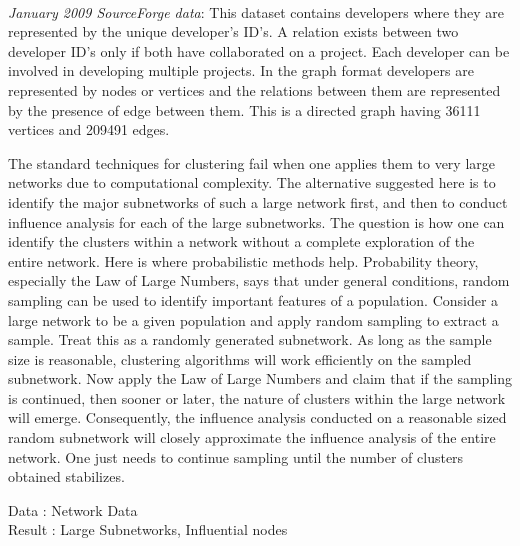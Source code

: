 \\
{\em January 2009 SourceForge data}: This dataset contains developers where they are represented by the unique developer's ID's.
A relation exists between two developer ID's only if both have collaborated on a project. Each developer can be involved
in developing multiple projects. In the graph format developers are represented by nodes or vertices and the
relations between them are represented by the presence of edge between them.
This is a directed graph having 36111 vertices and 209491 edges.


The standard techniques for clustering fail when one applies them to very large
networks due to computational complexity. The alternative suggested here is to
identify the major subnetworks of such a large network first, and then to
conduct influence analysis for each of the large subnetworks. The question is
how one can identify the clusters within a network without a complete exploration
of the entire network. Here is where probabilistic methods help. Probability
theory, especially the Law of Large Numbers, says that under general conditions,
random sampling can be used to identify important features of a population.
Consider a large network to be a given population and apply random sampling
to extract a sample. Treat this as a randomly generated subnetwork. As long
as the sample size is reasonable, clustering algorithms will work efficiently
on the sampled subnetwork. Now apply the Law of Large Numbers and claim
that if the sampling is continued, then sooner or later, the nature of
clusters within the large network will emerge. Consequently, the influence
analysis conducted on a reasonable sized random subnetwork will closely
approximate the influence analysis of the entire network. One just needs
to continue sampling until the number of clusters obtained stabilizes.

\pagebreak
{}

\noindent Data : Network Data\\
\noindent Result : Large Subnetworks, Influential nodes

